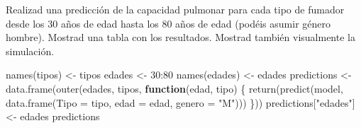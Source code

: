 \documentclass[
]{article}
\newenvironment{Shaded}{\begin{snugshade}}{\end{snugshade}}
\newcommand{\AttributeTok}[1]{\textcolor[rgb]{0.77,0.63,0.00}{#1}}
\newcommand{\ControlFlowTok}[1]{\textcolor[rgb]{0.13,0.29,0.53}{\textbf{#1}}}
\newcommand{\DecValTok}[1]{\textcolor[rgb]{0.00,0.00,0.81}{#1}}
\newcommand{\FunctionTok}[1]{\textcolor[rgb]{0.00,0.00,0.00}{#1}}
\newcommand{\NormalTok}[1]{#1}
\newcommand{\OtherTok}[1]{\textcolor[rgb]{0.56,0.35,0.01}{#1}}
\newcommand{\SpecialCharTok}[1]{\textcolor[rgb]{0.00,0.00,0.00}{#1}}
\newcommand{\StringTok}[1]{\textcolor[rgb]{0.31,0.60,0.02}{#1}}
\begin{document}
Realizad una predicción de la capacidad pulmonar para cada tipo de
fumador desde los 30 años de edad hasta los 80 años de edad (podéis
asumir género hombre). Mostrad una tabla con los resultados. Mostrad
también visualmente la simulación.

\vspace{0.3cm}

\begin{Shaded}
\begin{Highlighting}[]
\FunctionTok{names}\NormalTok{(tipos) }\OtherTok{\textless{}{-}}\NormalTok{ tipos}
\NormalTok{edades }\OtherTok{\textless{}{-}} \DecValTok{30}\SpecialCharTok{:}\DecValTok{80}
\FunctionTok{names}\NormalTok{(edades) }\OtherTok{\textless{}{-}}\NormalTok{ edades}
\NormalTok{predictions }\OtherTok{\textless{}{-}} \FunctionTok{data.frame}\NormalTok{(}\FunctionTok{outer}\NormalTok{(edades, tipos, }\ControlFlowTok{function}\NormalTok{(edad,}
\NormalTok{    tipo) \{}
    \FunctionTok{return}\NormalTok{(}\FunctionTok{predict}\NormalTok{(model, }\FunctionTok{data.frame}\NormalTok{(}\AttributeTok{Tipo =}\NormalTok{ tipo, }\AttributeTok{edad =}\NormalTok{ edad,}
        \AttributeTok{genero =} \StringTok{"M"}\NormalTok{)))}
\NormalTok{\}))}
\NormalTok{predictions[}\StringTok{"edades"}\NormalTok{] }\OtherTok{\textless{}{-}}\NormalTok{ edades}
\NormalTok{predictions}
\end{Highlighting}
\end{Shaded}
\end{document}
